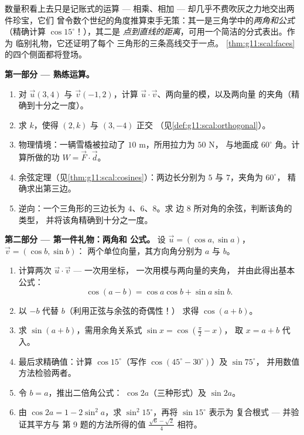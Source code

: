 \begin{problem}
\label{pb:g11:scal:1}
数量积看上去只是记账式的运算 --- 相乘、相加 ---
却几乎不费吹灰之力地交出两件珍宝，它们
曾令数个世纪的角度推算束手无策：其一是三角学中的\emph{两角和公式}
（精确计算 $\cos 15^\circ$！），其二是
\emph{点到直线的距离}，可用一个简洁的分式表出。作为
临别礼物，它还证明了每个
三角形的三条高线交于一点。
\cref{thm:g11:scal:faces}的四个侧面都将登场。

\medskip
\noindent\textbf{第一部分 --- 熟练运算。}
\begin{enumerate}
  \item 对 $\vec u(3, 4)$ 与 $\vec v(-1, 2)$，计算
        $\vec u \cdot \vec v$、两向量的模，以及两向量
        的夹角（精确到十分之一度）。
  \item 求 $k$，使得 $(2, k)$ 与 $(3, -4)$ 正交
        （见\cref{def:g11:scal:orthogonal}）。
  \item 物理情境：一辆雪橇被拉动了 $10$ m，所用拉力为 $50$ N，
        与地面成 $60^\circ$ 角。计算所做的功
        $W = \vec F \cdot \vec d$。
  \item 余弦定理（见\cref{thm:g11:scal:cosines}）：两边长分别为
        $5$ 与 $7$，夹角为 $60^\circ$，
        精确求出第三边。
  \item 逆向：一个三角形的三边长为 $4$、$6$、$8$。求
        边 $8$ 所对角的余弦，判断该角的类型，
        并将该角精确到十分之一度。
\end{enumerate}

\medskip
\noindent\textbf{第二部分 --- 第一件礼物：两角和
公式。}
设 $\vec u = (\cos a, \sin a)$，$\vec v = (\cos b, \sin b)$：
两个单位向量，其方向角分别为 $a$ 与 $b$。
\begin{enumerate}[resume]
  \item 计算两次 $\vec u \cdot \vec v$ --- 一次用坐标，
        一次用模与两向量的夹角，
        并由此得出基本公式：
        \[
        \cos(a - b) = \cos a \cos b + \sin a \sin b .
        \]
  \item 以 $-b$ 代替 $b$（利用正弦与余弦的奇偶性！）
        求得 $\cos(a + b)$。
  \item 求 $\sin(a + b)$，需用余角关系式
        $\sin x = \cos\left(\frac\pi2 - x\right)$，
        取 $x = a + b$ 代入。
  \item 最后求精确值：计算 $\cos 15^\circ$（写作
        $\cos(45^\circ - 30^\circ)$）及 $\sin 75^\circ$，
        并用数值方法检验两者。
  \item 令 $b = a$，推出二倍角公式：
        $\cos 2a$（三种形式）及 $\sin 2a$。
  \item 由 $\cos 2a = 1 - 2\sin^2 a$，求
        $\sin^2 15^\circ$，再将 $\sin 15^\circ$ 表示为
        复合根式 --- 并验证其平方与
        第 9 题的方法所得的值 $\frac{\sqrt6 - \sqrt2}{4}$
        相符。
\end{enumerate}


\end{problem}
